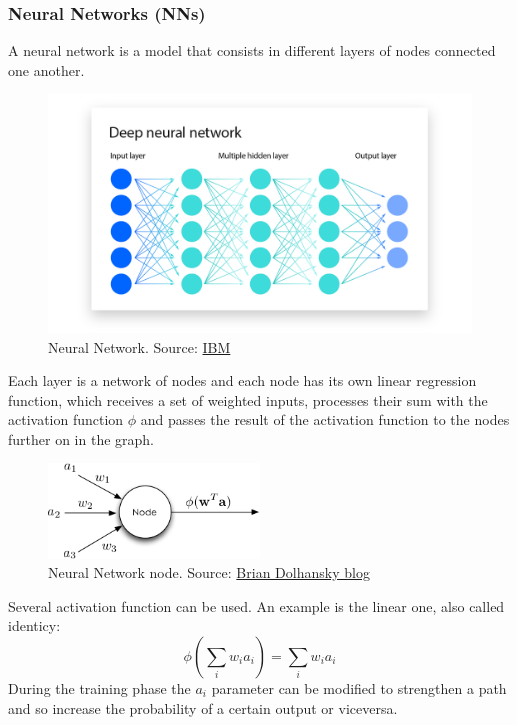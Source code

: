 \documentclass[12pt]{article}
\begin{document}
    \subsubsection{Neural Networks (NNs)}
A neural network is a model that consists in different layers of nodes connected one another.\begin{figure}[H]
\centering
        \includegraphics[width=1.3\textwidth]{DeepNeuralNetwork.png}
\caption[Neural Network]{Neural Network. Source: \href{https://www.ibm.com/topics/neural-networks}{IBM}}
\label{fig:nodeNN}
\end{figure}
Each layer is a network of nodes and each node has its own linear regression function, which receives a set of weighted inputs, processes their sum with the activation function $\phi$ and passes the result of the activation function to the nodes further on in the graph. 
    \begin{figure}[H]
    \centering
            \includegraphics[width=0.5\textwidth]{nodeNN.png}
    \caption[Neural Network node]{Neural Network node. Source: \href{https://www.briandolhansky.com/blog/artificial-neural-networks-linear-regression-part-1}{Brian Dolhansky blog}}
    \end{figure}
Several activation function can be used. An example is the linear one, also called identicy:
$$ \phi \left( \sum_i w_i a_i \right) =  \sum_i w_i a_i $$
During the training phase the $a_i$ parameter can be modified to strengthen a path and so increase the probability of a certain output or viceversa.\\
\end{document}
